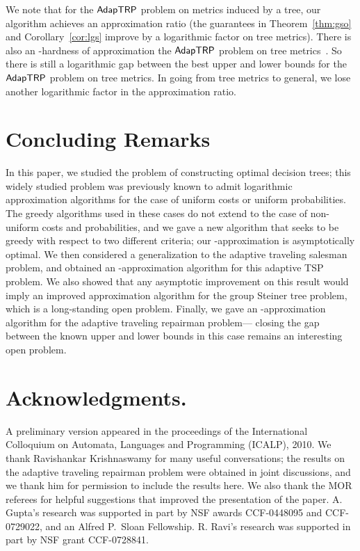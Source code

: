 \documentclass[11pt]{article}
\def\strp{\ensuremath{{\sf AdapTRP}}\xspace}
\begin{document}
We note that for the \strp problem on metrics induced by a tree, our algorithm achieves an  approximation ratio (the guarantees in Theorem~\ref{thm:gso} and Corollary~\ref{cor:lgs} improve by a logarithmic  factor on tree metrics). There is also an -hardness of
approximation the \strp problem on tree metrics~\cite{Vish-thesis}. So there is still a logarithmic gap between the best upper and lower bounds for the \strp problem on tree metrics. In going from tree metrics to general, we lose another logarithmic  factor in the approximation ratio. 






\section{Concluding Remarks}

In this paper, we studied the problem of constructing optimal decision
trees;  this widely studied problem was previously known to admit logarithmic
approximation algorithms for the case of uniform costs or uniform
probabilities. The greedy algorithms used in these cases do not extend
to the case of non-uniform costs and probabilities, and
we gave a new algorithm that seeks to be greedy with respect to two
different criteria; our -approximation is
asymptotically optimal. We then considered a generalization to the adaptive traveling salesman
problem, and obtained an
-approximation algorithm for this adaptive TSP problem. We also showed
that any asymptotic improvement on this result would imply an improved
approximation algorithm for the group Steiner tree problem, which is a long-standing
open problem. Finally, we gave an -approximation algorithm for the adaptive
traveling repairman problem--- closing the 
 gap
between the known upper and lower bounds in this case remains an 
interesting open problem.



\section*{Acknowledgments.}
A preliminary version appeared in the proceedings of the International Colloquium on Automata, Languages and Programming (ICALP), 2010. We thank Ravishankar Krishnaswamy for many useful conversations; the results on the adaptive traveling repairman problem were obtained in joint discussions, and we thank him for permission to include the results here. We also thank the MOR referees for helpful suggestions that improved the presentation of the paper. 
A. Gupta's research was supported in part by NSF awards CCF-0448095 and CCF-0729022, and an Alfred P.~Sloan Fellowship. R. Ravi's  research was supported in part by NSF grant
  CCF-0728841.
\end{document}

